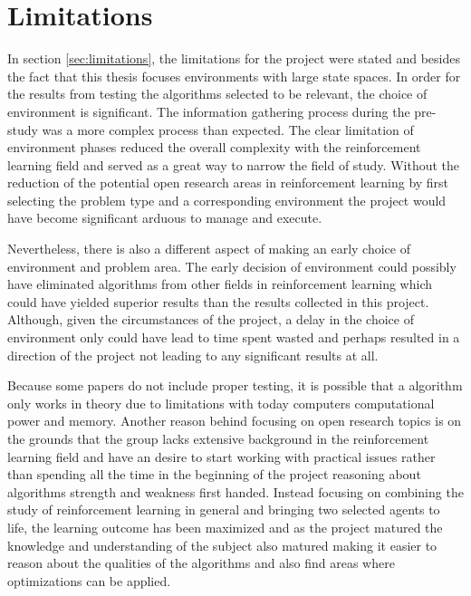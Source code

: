 \section{Limitations }
\label{sec:discuss_limitations}
In section \ref{sec:limitations}, the limitations for the project were stated and besides the fact that this thesis focuses environments with large state spaces. In order for the results from testing the algorithms selected to be relevant, the choice of environment is significant. The information gathering process during the pre-study was a more complex process than expected. The clear limitation of environment phases reduced the overall complexity with the reinforcement learning field and served as a great way to narrow the field of study. Without the reduction of the potential open research areas in reinforcement learning by first selecting the problem type and a corresponding environment the project would have become significant arduous to manage and execute. 

Nevertheless, there is also a different aspect of making an early choice of environment and problem area. The early decision of environment could possibly have eliminated algorithms from other fields in reinforcement learning which could have yielded superior results than the results collected in this project. Although, given the circumstances of the project, a delay in the choice of environment only could have lead to time spent wasted and perhaps resulted in a direction of the project not leading to any significant results at all. 

Because some papers do not include proper testing, it is possible that a algorithm only works in theory due to limitations with today computers computational power and memory. Another reason behind focusing on open research topics is on the grounds that the group lacks extensive background in the reinforcement learning field and have an desire to start working with practical issues rather than spending all the time in the beginning of the project reasoning about algorithms strength and weakness first handed. Instead focusing on combining the study of reinforcement learning in general and bringing two selected agents to life, the learning outcome has been maximized and as the project matured the knowledge and understanding of the subject also matured making it easier to reason about the qualities of the algorithms and also find areas where optimizations can be applied. 